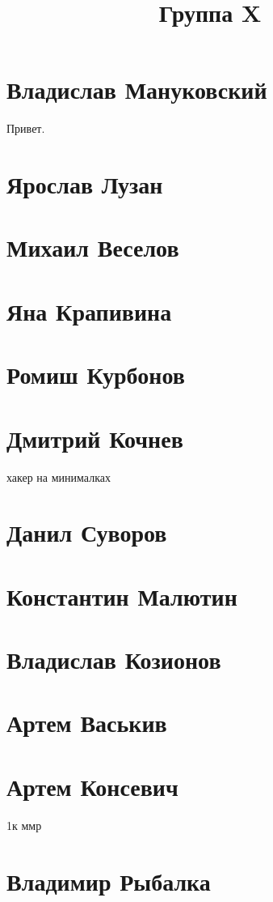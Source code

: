 \documentclass{article}
\title{Группа X}
\begin{document}
\section*{Владислав Мануковский}
Привет.
\section*{Ярослав Лузан}

\section*{Михаил Веселов}

\section*{Яна Крапивина}

\section*{Ромиш Курбонов}

\section*{Дмитрий Кочнев}
хакер на минималках
\section*{Данил Суворов}

\section*{Константин Малютин}

\section*{Владислав Козионов}

\section*{Артем Васькив}

\section*{Артем Консевич}
1к ммр
\section*{Владимир Рыбалка}
\end{document}
